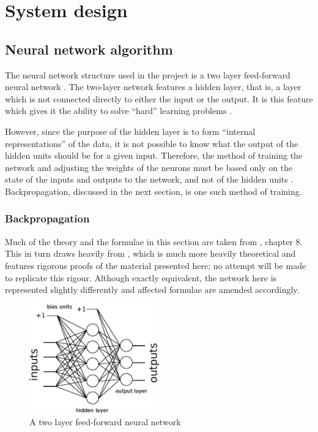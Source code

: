 \chapter{System design}
\label{ch:design}

\section{Neural network algorithm}
\label{sec:nnalgorithm}
The neural network structure used in the project is a two layer feed-forward neural network \citep[p. 7]{Annema1995}.  The two-layer network features a hidden layer, that is, a layer which is not connected directly to either the input or the output.  It is this feature which gives it the ability to solve ``hard'' learning problems \citep[p. 134]{Aleksander1995}.

However, since the purpose of the hidden layer is to form ``internal representations'' of the data, it is not possible to know what the output of the hidden units should be for a given input.  Therefore, the method of training the network and adjusting the weights of the neurons must be based only on the state of the inputs and outputs to the network, and not of the hidden units \cite[p. 136]{Aleksander1995}.  Backpropagation, discussed in the next section, is one such method of training.

\subsection{Backpropagation}

Much of the theory and the formulae in this section are taken from \citet{Aleksander1995}, chapter 8.  This in turn draws heavily from \citet{Rumelhart1986}, which is much more heavily theoretical and features rigorous proofs of the material presented here; no attempt will be made to replicate this rigour.  Although exactly equivalent, the network here is represented slightly differently and affected formulae are amended accordingly.

\begin{figure}[ht]
\centering
\includegraphics[width=0.5\textwidth]{diagrams/neuralnet}
\caption{A two layer feed-forward neural network}
\label{fig:neuralnet}
\end{figure}

